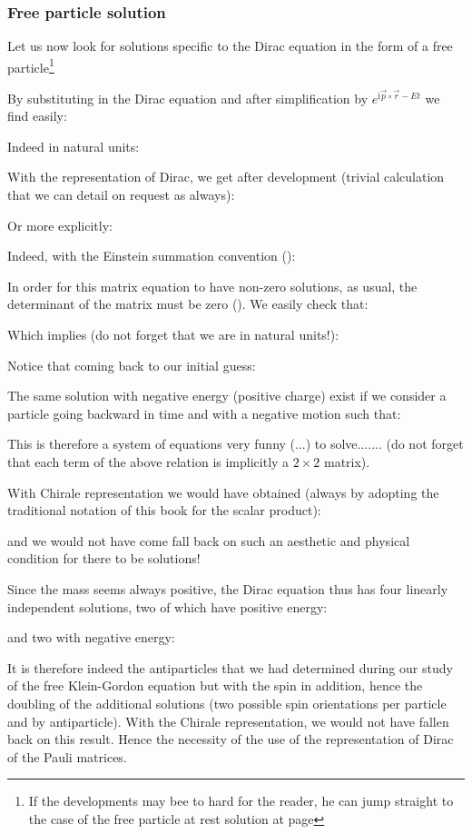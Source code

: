 	\subsubsection{Free particle solution}
	Let us now look for solutions specific to the Dirac equation in the form of a free particle\footnote{If the developments may bee to hard for the reader, he can jump straight to the case of the free particle at rest solution at page \pageref{free particle solution at rest}}
	
	By substituting in the Dirac equation and after simplification by $e^{\mathrm{i}\vec{p}\circ\vec{r}-Et}$ we find easily:
	
	Indeed in natural units:
	
	With the representation of Dirac, we get after development (trivial calculation that we can detail on request as always):
	
	Or more explicitly:
	
	Indeed, with the Einstein summation convention ():
	
	In order for this matrix equation to have non-zero solutions, as usual, the determinant of the matrix must be zero (). We easily check that:
	
	Which implies (do not forget that we are in natural units!):
	
	Notice that coming back to our initial guess:
	
	The same solution with negative energy (positive charge) exist if we consider a particle going backward in time and with a negative motion such that:
	
	
	This is therefore a system of equations very funny (...) to solve....... (do not forget that each term of the above relation is implicitly a $2\times 2$ matrix).
	
	With Chirale representation we would have obtained (always by adopting the traditional notation of this book for the scalar product):
	
	and we would not have come fall back on such an aesthetic and physical condition for there to be solutions!

Since the mass seems always positive, the Dirac equation thus has four linearly independent solutions, two of which have positive energy:
	
	and two with negative energy:
	
	It is therefore indeed the antiparticles that we had determined during our study of the free Klein-Gordon equation but with the spin in addition, hence the doubling of the additional solutions (two possible spin orientations per particle and by antiparticle). With the Chirale representation, we would not have fallen back on this result. Hence the necessity of the use of the representation of Dirac of the Pauli matrices.

